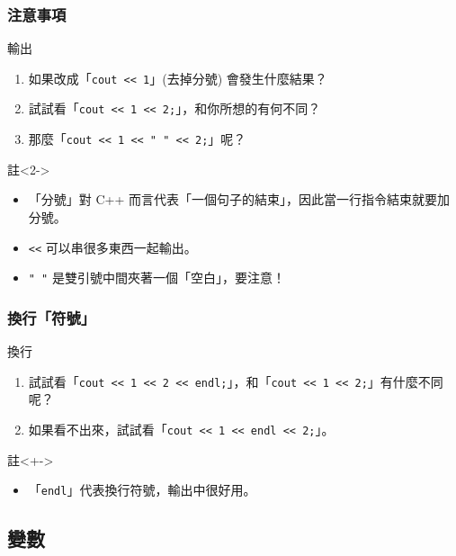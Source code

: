 \documentclass[utf8]{beamer}
\begin{document}
\begin{CJK}{UTF8}{bkai}
\begin{frame}[fragile]
  \frametitle{注意事項}
  \begin{block}{輸出}
    \begin{enumerate}
    \item<1-> 如果改成「\lstinline{cout << 1}{}」(去掉分號) 會發生什麼結果？
    \item<3-> 試試看「\lstinline{cout << 1 << 2;}{}」，和你所想的有何不同？
    \item<5-> 那麼「\lstinline{cout << 1 << " " << 2;}{}」呢？
    \end{enumerate}
  \end{block}
  \begin{exampleblock}{註}<2->
    \begin{itemize}
    \item<2-> 「分號」對 C++ 而言代表「\alert{一個句子的結束}」，因此當一行\alert{指令結束就要加分號}。
    \item<4-> \lstinline{<<}{} 可以串很多東西一起輸出。
    \item<5-> \lstinline{" "}{} 是雙引號中間夾著一個「空白」，\alert{要注意}！
    \end{itemize}
  \end{exampleblock}
\end{frame}

\begin{frame}[fragile]
  \frametitle{換行「符號」}
  \begin{block}{換行}
    \begin{enumerate}[<+->]
    \item 試試看「\lstinline{cout << 1 << 2 << endl;}{}」，和「\lstinline{cout << 1 << 2;}{}」有什麼不同呢？
    \item 如果看不出來，試試看「\lstinline{cout << 1 << endl << 2;}{}」。
    \end{enumerate}
  \end{block}
  \begin{exampleblock}{註}<+->
    \begin{itemize}
    \item 「\lstinline{endl}」代表\alert{換行}符號，輸出中很好用。
    \end{itemize}
  \end{exampleblock}
\end{frame}

\subsection{變數}


\end{CJK}
\end{document}
